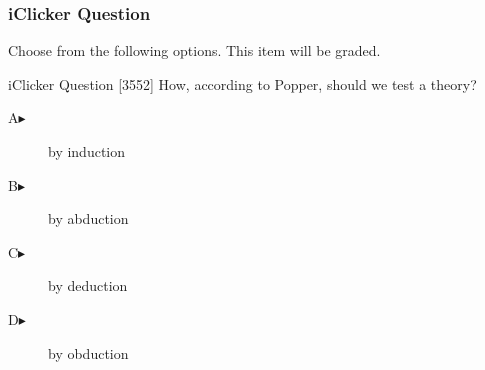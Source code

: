\begin{frame}
  \frametitle{iClicker Question}
Choose from the following options. This item will be graded.
\begin{block}{iClicker Question}
[3552] How, according to Popper, should we test a theory?
\end{block}
\begin{description}
\item[A\hspace{.2in}$\blacktriangleright$] by induction
\item[B\hspace{.2in}$\blacktriangleright$] by abduction
\item[C\hspace{.2in}$\blacktriangleright$] by deduction
\item[D\hspace{.2in}$\blacktriangleright$] by obduction
\end{description}
\end{frame}
